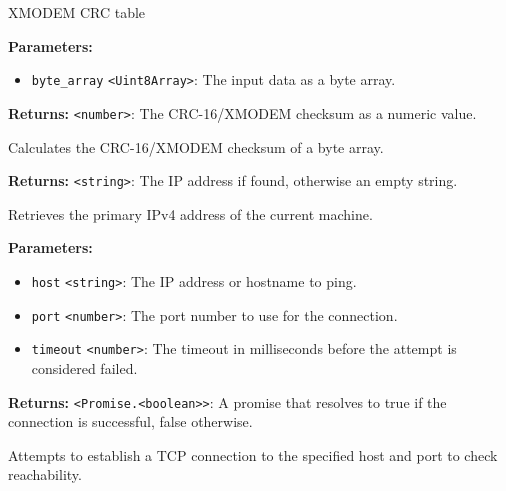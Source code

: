 \documentclass[12pt,a4paper]{article}
\begin{document}
\noindent XMODEM CRC table

\vspace{5mm}
\noindent {}


\noindent \textbf{Parameters:}
\begin{itemize}
  \item \texttt{byte\_array} \texttt{<Uint8Array>}: The input data as a byte array.
\end{itemize}

\noindent \textbf{Returns:} \texttt{<number>}: The CRC-16/XMODEM checksum as a numeric value.

\noindent Calculates the CRC-16/XMODEM checksum of a byte array.

\vspace{5mm}
\noindent {}


\noindent \textbf{Returns:} \texttt{<string>}: The IP address if found, otherwise an empty string.

\noindent Retrieves the primary IPv4 address of the current machine.

\vspace{5mm}
\noindent {}


\noindent \textbf{Parameters:}
\begin{itemize}
  \item \texttt{host} \texttt{<string>}: The IP address or hostname to ping.
  \item \texttt{port} \texttt{<number>}: The port number to use for the connection.
  \item \texttt{timeout} \texttt{<number>}: The timeout in milliseconds before the attempt is considered failed.
\end{itemize}

\noindent \textbf{Returns:} \texttt{<Promise.<boolean>>}: A promise that resolves to \textasciigrave{}true\textasciigrave{} if the connection is successful, \textasciigrave{}false\textasciigrave{} otherwise.

\noindent Attempts to establish a TCP connection to the specified host and port to check reachability.
\end{document}
